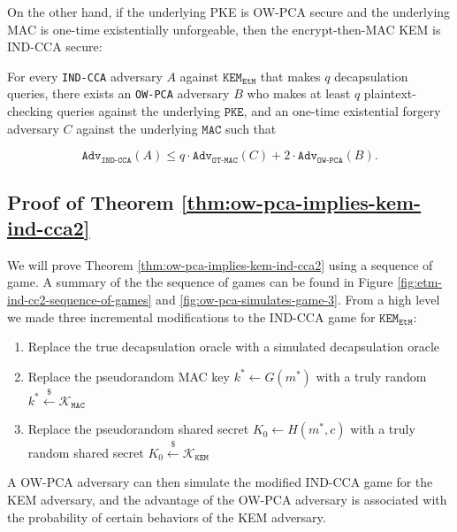 \documentclass[runningheads]{llncs}
\newcommand{\pke}{\texttt{PKE}}
\newcommand{\kem}{\texttt{KEM}}
\newcommand{\etm}{\texttt{EtM}}  %
\newcommand{\mac}{\texttt{MAC}}
\newcommand{\leftsample}{\stackrel{\$}{\leftarrow}}
\newcommand{\adv}{\texttt{Adv}}
\begin{document}
On the other hand, if the underlying PKE is OW-PCA secure and the underlying MAC is one-time existentially unforgeable, then the encrypt-then-MAC KEM is IND-CCA secure:

\begin{theorem}\label{thm:ow-pca-implies-kem-ind-cca2}
    For every \texttt{IND-CCA} adversary $A$ against $\kem_\etm$ that makes $q$ decapsulation queries, there exists an \texttt{OW-PCA} adversary $B$ who makes at least $q$ plaintext-checking queries against the underlying $\pke$, and an one-time existential forgery adversary $C$ against the underlying $\mac$ such that

    \begin{equation*}
        \texttt{Adv}_\texttt{IND-CCA}(A) \leq q \cdot \adv_\texttt{OT-MAC}(C) + 2 \cdot \texttt{Adv}_\texttt{OW-PCA}(B).
    \end{equation*}
\end{theorem}

\subsection{Proof of Theorem \ref{thm:ow-pca-implies-kem-ind-cca2}}\label{sec:proof-of-theorem}
We will prove Theorem \ref{thm:ow-pca-implies-kem-ind-cca2} using a sequence of game. A summary of the the sequence of games can be found in Figure \ref{fig:etm-ind-cc2-sequence-of-games} and \ref{fig:ow-pca-simulates-game-3}. From a high level we made three incremental modifications to the IND-CCA game for $\kem_\etm$: \begin{enumerate}
    \setlength\itemsep{0.1em}
    \item Replace the true decapsulation oracle with a simulated decapsulation oracle
    \item Replace the pseudorandom MAC key $k^\ast \leftarrow G(m^\ast)$ with a truly random $k^\ast \leftsample \mathcal{K}_\mac$
    \item Replace the pseudorandom shared secret $K_0 \leftarrow H(m^\ast, c)$ with a truly random shared secret $K_0 \leftsample \mathcal{K}_\kem$
\end{enumerate}

A OW-PCA adversary can then simulate the modified IND-CCA game for the KEM adversary, and the advantage of the OW-PCA adversary is associated with the probability of certain behaviors of the KEM adversary.
\end{document}
